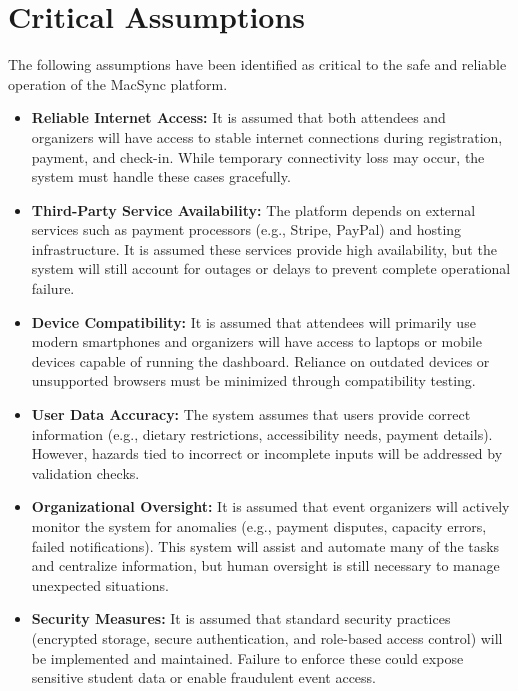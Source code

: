 \documentclass{article}
\begin{document}
\section{Critical Assumptions}

The following assumptions have been identified as critical to the safe and reliable operation of the MacSync platform.

\begin{itemize}
    \item \textbf{Reliable Internet Access:} It is assumed that both attendees and organizers will have access to stable internet connections during registration, payment, and check-in. While temporary connectivity loss may occur, the system must handle these cases gracefully.
    
    \item \textbf{Third-Party Service Availability:} The platform depends on external services such as payment processors (e.g., Stripe, PayPal) and hosting infrastructure. It is assumed these services provide high availability, but the system will still account for outages or delays to prevent complete operational failure.
    
    \item \textbf{Device Compatibility:} It is assumed that attendees will primarily use modern smartphones and organizers will have access to laptops or mobile devices capable of running the dashboard. Reliance on outdated devices or unsupported browsers must be minimized through compatibility testing.
    
    \item \textbf{User Data Accuracy:} The system assumes that users provide correct information (e.g., dietary restrictions, accessibility needs, payment details). However, hazards tied to incorrect or incomplete inputs will be addressed by validation checks.
    
    \item \textbf{Organizational Oversight:} It is assumed that event organizers will actively monitor the system for anomalies (e.g., payment disputes, capacity errors, failed notifications). This system will assist and automate many of the tasks and centralize information, but human oversight is still necessary to manage unexpected situations.
    
    \item \textbf{Security Measures:} It is assumed that standard security practices (encrypted storage, secure authentication, and role-based access control) will be implemented and maintained. Failure to enforce these could expose sensitive student data or enable fraudulent event access.
\end{itemize}
\end{document}
